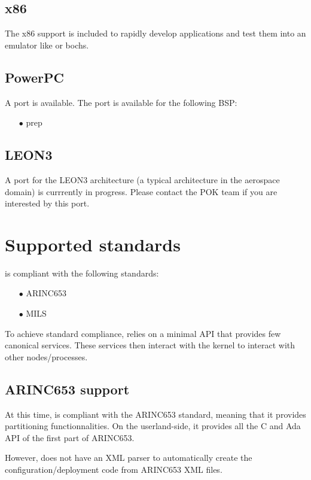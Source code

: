      \subsection{x86}
      The x86 support is included to rapidly develop applications and 
      test them into an emulator like \qemu or bochs.

      \subsection{PowerPC}
      A \powerpc port is available. The port is available for the following BSP:
      \begin{itemize}
         \item[$\bullet$]
            prep
      \end{itemize}

      \subsection{LEON3}
      A port for the LEON3 architecture (a typical architecture in the aerospace
      domain) is currrently in progress. Please contact the POK team if you are
      interested by this port.


   \section{Supported standards}
   \pok is compliant with the following standards:
   \begin{itemize}
      \item[$\bullet$] ARINC653
      \item[$\bullet$] MILS
   \end{itemize}

   To achieve standard compliance, \pok relies on a minimal API that provides few
   canonical services. These services then interact with the kernel to interact
   with other nodes/processes.

      \subsection{ARINC653 support}
      At this time, \pok is compliant with the ARINC653 standard, meaning that it
      provides partitioning functionnalities. On the userland-side, it provides
      all the C and Ada API of the first part of ARINC653.

      However, \pok does not have an XML parser to automatically create the
      configuration/deployment code from ARINC653 XML files. 
     
